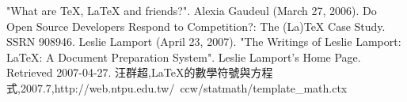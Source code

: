 "What are TeX, LaTeX and friends?".
Alexia Gaudeul (March 27, 2006). Do Open Source Developers Respond to Competition?: The (La)TeX Case Study. SSRN 908946.
Leslie Lamport (April 23, 2007). "The Writings of Leslie Lamport: LaTeX: A Document Preparation System". Leslie Lamport's Home Page. Retrieved 2007-04-27.
汪群超,\LaTeX 的數學符號與方程式,2007.7,http://web.ntpu.edu.tw/~ccw/statmath/template\_math.ctx
